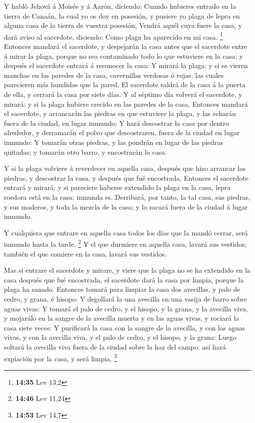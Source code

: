  Y habló Jehová á Moisés y á Aarón, diciendo:
 Cuando hubieres entrado en la tierra de Canaán, la cual
yo os doy en posesión, y pusiere yo plaga de lepra en alguna casa de la
tierra de vuestra posesión,  Vendrá aquél cuya fuere la
casa, y dará aviso al sacerdote, diciendo: Como plaga ha aparecido en mi
casa. \footnote{\textbf{14:35} Lev 13,2}  Entonces
mandará el sacerdote, y despejarán la casa antes que el sacerdote entre
á mirar la plaga, porque no sea contaminado todo lo que estuviere en la
casa: y después el sacerdote entrará á reconocer la casa:
 Y mirará la plaga: y si se vieren manchas en las paredes
de la casa, cavernillas verdosas ó rojas, las cuales parecieren más
hundidas que la pared,  El sacerdote saldrá de la casa á
la puerta de ella, y cerrará la casa por siete días.  Y
al séptimo día volverá el sacerdote, y mirará: y si la plaga hubiere
crecido en las paredes de la casa,  Entonces mandará el
sacerdote, y arrancarán las piedras en que estuviere la plaga, y las
echarán fuera de la ciudad, en lugar inmundo:  Y hará
descostrar la casa por dentro alrededor, y derramarán el polvo que
descostraren, fuera de la ciudad en lugar inmundo:  Y
tomarán otras piedras, y las pondrán en lugar de las piedras quitadas; y
tomarán otro barro, y encostrarán la casa.

 Y si la plaga volviere á reverdecer en aquella casa,
después que hizo arrancar las piedras, y descostrar la casa, y después
que fué encostrada,  Entonces el sacerdote entrará y
mirará; y si pareciere haberse extendido la plaga en la casa, lepra
roedora está en la casa: inmunda es.  Derribará, por
tanto, la tal casa, sus piedras, y sus maderos, y toda la mezcla de la
casa; y lo sacará fuera de la ciudad á lugar inmundo.

 Y cualquiera que entrare en aquella casa todos los días
que la mandó cerrar, será inmundo hasta la tarde. \footnote{\textbf{14:46}
  Lev 11,24}  Y el que durmiere en aquella casa, lavará
sus vestidos; también el que comiere en la casa, lavará sus vestidos.

 Mas si entrare el sacerdote y mirare, y viere que la
plaga no se ha extendido en la casa después que fué encostrada, el
sacerdote dará la casa por limpia, porque la plaga ha sanado.
 Entonces tomará para limpiar la casa dos avecillas, y
palo de cedro, y grana, é hisopo:  Y degollará la una
avecilla en una vasija de barro sobre aguas vivas:  Y
tomará el palo de cedro, y el hisopo, y la grana, y la avecilla viva, y
mojarálo en la sangre de la avecilla muerta y en las aguas vivas, y
rociará la casa siete veces:  Y purificará la casa con la
sangre de la avecilla, y con las aguas vivas, y con la avecilla viva, y
el palo de cedro, y el hisopo, y la grana:  Luego soltará
la avecilla viva fuera de la ciudad sobre la haz del campo: así hará
expiación por la casa, y será limpia. \footnote{\textbf{14:53} Lev 14,7}

